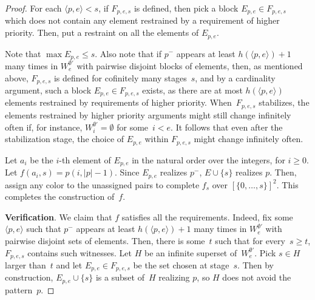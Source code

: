 \documentclass{article}
\numberwithin{theorem}{section}
\theoremstyle{definition}
\begin{document}
\begin{proof}
    For each $\langle p,e \rangle < s$, if $F_{p, e,s}$ is defined, then pick a block $E_{p, e } \in F_{p, e,s}$ which does not contain any element restrained by a requirement of higher priority. Then, put a restraint on all the elements of $E_{p, e }$. 
    
    Note that $\max E_{p,e  } \leq s$. Also note that if $p^{-}$ appears at least $h(\langle p,e \rangle)+1$ many times in $W^{\emptyset'}_e$ with pairwise disjoint blocks of elements, then, as mentioned above, $F_{p, e, s}$ is defined for cofinitely many stages~$s$, and by a cardinality argument, such a block $E_{p, e } \in F_{p, e,s}$ exists, as there are at most $h(\langle p, e\rangle)$ elements restrained by requirements of higher priority. When~$F_{p, e, s}$ stabilizes, the elements restrained by higher priority arguments might still change infinitely often if, for instance, $W_i^{\emptyset'} = \emptyset$ for some~$i < e$. It follows that even after the stabilization stage, the choice of $E_{p, e}$ within $F_{p, e,s}$ might change infinitely often.

    Let $a_i$ be the $i$-th element of $E_{p,e  }$ in the natural order over the integers, for $i \geq 0$. Let $f(a_i,s) = p(i,|p|-1)$. Since $E_{p,e  }$ realizes $p^-$, $E \cup \{s\}$ realizes $p$.
    Then, assign any color to the unassigned pairs to complete $f_{s}$ over $[\{0,\dots, s\}]^2$. This completes the construction of~$f$.
    \smallskip


\textbf{Verification}. We claim that $f$ satisfies all the requirements. Indeed, fix some~$\langle p,e \rangle$ such that $p^{-}$ appears at least $h(\langle p,e \rangle)+1$ many times in $W^{\emptyset'}_e$ with pairwise disjoint sets of elements. Then, there is some~$t$ such that for every~$s \geq t$, $F_{p, e,s}$ contains such witnesses. Let $H$ be an infinite superset of~$W_e^{\emptyset'}$. Pick $s \in H$ larger than~$t$ and let $E_{p, e } \in F_{p, e,s}$ be the set chosen at stage~$s$. Then by construction, $E_{p, e } \cup \{s\}$ is a subset of~$H$ realizing $p$, so $H$ does not avoid the pattern~$p$.
    \smallskip


\end{proof}
\end{document}
